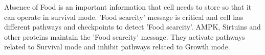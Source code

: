 Absence of Food is an important information that cell needs to store so that it can operate in survival mode. 'Food scarcity' message is critical and cell has different pathways and checkpoints to detect 'Food scarcity'. AMPK, Sirtuins and other proteins maintain the 'Food scarcity' message. They activate pathways related to Survival mode and inhibit pathways related to Growth mode.